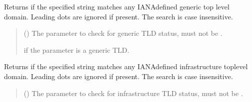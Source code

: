 \documentclass[letterpaper,10pt,english]{sphinxmanual}
\begin{document}
\begin{fulllineitems}
\begin{fulllineitems}
\label{\detokenize{apache_commons_validator_python.routines:apache_commons_validator_python.routines.domain_validator.DomainValidator.is_valid_generic_tld}}
\pysigstartsignatures
{}
\pysigstopsignatures
\sphinxAtStartPar
Returns  if the specified string matches any IANA\sphinxhyphen{}defined generic top\sphinxhyphen{}
level domain. Leading dots are ignored if present. The search is case\sphinxhyphen{}
insensitive.
\begin{quote}\begin{description}
\sphinxAtStartPar
{} () \textendash{} The parameter to check for generic TLD status, must not be .

\sphinxAtStartPar
{} if the parameter is a generic TLD.

\end{description}\end{quote}

\end{fulllineitems}


\begin{fulllineitems}
\label{\detokenize{apache_commons_validator_python.routines:apache_commons_validator_python.routines.domain_validator.DomainValidator.is_valid_infrastructure_tld}}
\pysigstartsignatures
{}
\pysigstopsignatures
\sphinxAtStartPar
Returns  if the specified string matches any IANA\sphinxhyphen{}defined infrastructure
top\sphinxhyphen{}level domain. Leading dots are ignored if present. The search is case\sphinxhyphen{}
insensitive.
\begin{quote}\begin{description}
\sphinxAtStartPar
{} () \textendash{} The parameter to check for infrastructure TLD status, must not be .


\end{description}
\end{quote}
\end{fulllineitems}
\end{fulllineitems}
\end{document}
